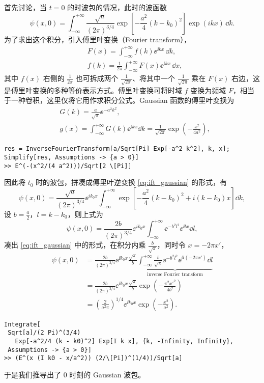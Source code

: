 首先讨论，当 $t = 0$ 的时波包的情况，此时的波函数
\begin{equation}\label{eq:wp_t0}
\psi(x, 0) = \int_{-\infty}^{+\infty} \frac{\sqrt{a}}{(2 \pi)^{3/4}} \exp \left[ - \frac{a^2}{4} (k - k_0)^2 \right] \exp \left( i  k x  \right) \, \dd k. 
\end{equation}
为了求出这个积分，引入傅里叶变换（Fourier transform），
\begin{align}
    &F(x) = \int_{-\infty}^{+\infty} f(k) \ee^{\ii kx}\,\dd k, \\
    &f(k) = \frac1{2\pi}\int_{-\infty}^{+\infty} F(x) \ee^{\ii kx}\, \dd x, 
\end{align}
其中 $f(x)$ 右侧的 $\frac{1}{2\pi}$ 也可拆成两个 $\frac1{\sqrt{2\pi}}$、将其中一个 $\frac1{\sqrt{2\pi}}$ 乘在 $F(x)$ 右边，这是傅里叶变换的多种等价表示方式。傅里叶变换可将时域 $f$ 变换为频域 $F$，相当于一种卷积，这里仅将它用作求积分公式。Gaussian 函数的傅里叶变换为
\begin{align}
    &G(k) = \frac a{\sqrt \pi} \ee^{-a^2 k^2}, \\
    &g(x) = %
    \int_{-\infty}^{+\infty} G(k) \ee^{\ii kx} \dd k =  \frac{1}{\sqrt{2\pi}} \exp\left(-\frac{x^2}{4a^2}\right), \label{eq:ift_gaussian}
\end{align}
\begin{lstlisting}
res = InverseFourierTransform[a/Sqrt[Pi] Exp[-a^2 k^2], k, x];
Simplify[res, Assumptions -> {a > 0}]
>> E^(-(x^2/(4 a^2)))/Sqrt[2 \[Pi]]
\end{lstlisting}
因此将 $t_0$ 时的波包，拼凑成傅里叶逆变换 \eqref{eq:ift_gaussian} 的形式，有
\begin{equation}
    \psi(x, 0) = \frac{\sqrt{a}}{(2 \pi)^{3/4}}  \ee^{i  k_0 x} \int_{-\infty}^{+\infty} \exp \left[ - \frac{a^2}{4} (k - k_0)^2 + i(k-k_0)x  \right] \dd k,
\end{equation}
设 $b = \frac a2$，$l = k-k_0$，则上式为
\begin{equation}
    \psi(x, 0) = \frac{2b}{(2 \pi)^{3/4}} \ee^{i  k_0 x} \int_{-\infty}^{+\infty} 
    \ee^{-b^2l^2} \ee^{\ii l x} \dd l, 
\end{equation}
凑出 \eqref{eq:ift_gaussian} 中的形式，在积分内乘 $\frac b{\sqrt{\pi}}$，同时令 $x = - 2\pi x'$，
\begin{align}
    \psi(x,0) &= \frac{2b}{(2 \pi)^{3/4}} \ee^{\ii k_0 x} \frac{\sqrt{\pi}}b \underbrace{\int_{-\infty}^{+\infty} \frac b{\sqrt{\pi}} \ee^{-b^2l^2} \ee^{\ii l (-2\pi x')} \dd l}_{\text{inverse Fourier transform}} \\
    &= \frac{2b}{(2 \pi)^{3/4}} \ee^{\ii k_0 x} \frac{\sqrt{\pi}}b  \exp\left(-\frac{\pi^2x'^2}{4 b^2}\right) \\
    &= \left(\frac{2}{a^2\pi}\right)^{1/4} \ee^{\ii k_0 x} \exp\left(-\frac{x^2}{a^2}\right). \label{eq:wp_photon_t0}
\end{align}
\begin{lstlisting}
Integrate[
 Sqrt[a]/(2 Pi)^(3/4)
   Exp[-a^2/4 (k - k0)^2] Exp[I k x], {k, -Infinity, Infinity}, 
 Assumptions -> {a > 0}]
>> (E^(x (I k0 - x/a^2)) (2/\[Pi])^(1/4))/Sqrt[a]
\end{lstlisting}
于是我们推导出了 0 时刻的 Gaussian 波包。%

